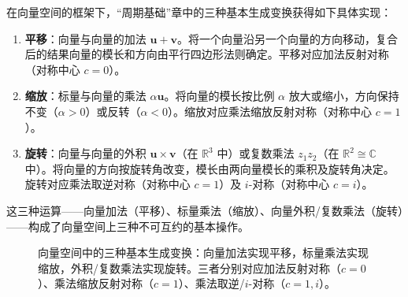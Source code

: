 \begin{definition}[向量运算与三种基本生成变换]\label{def:vector_three_transformations}
在向量空间的框架下，“周期基础”章中的三种基本生成变换获得如下具体实现：
\begin{enumerate}[label=(\roman*)]
    \item \textbf{平移}：向量与向量的加法 $\mathbf{u} + \mathbf{v}$。将一个向量沿另一个向量的方向移动，复合后的结果向量的模长和方向由平行四边形法则确定。平移对应加法反射对称（对称中心 $c=0$）。
    \item \textbf{缩放}：标量与向量的乘法 $\alpha \mathbf{u}$。将向量的模长按比例 $\alpha$ 放大或缩小，方向保持不变（$\alpha > 0$）或反转（$\alpha < 0$）。缩放对应乘法缩放反射对称（对称中心 $c = 1$）。
    \item \textbf{旋转}：向量与向量的外积 $\mathbf{u} \times \mathbf{v}$（在 $\mathbb{R}^3$ 中）或复数乘法 $z_1 z_2$（在 $\mathbb{R}^2 \cong \mathbb{C}$ 中）。将向量的方向按旋转角改变，模长由两向量模长的乘积及旋转角决定。旋转对应乘法取逆对称（对称中心 $c=1$）及 $i$-对称（对称中心 $c=i$）。
\end{enumerate}
这三种运算——向量加法（平移）、标量乘法（缩放）、向量外积/复数乘法（旋转）——构成了向量空间上三种不可互约的基本操作。
\end{definition}

\begin{figure}[htbp]
\centering
{}
\caption{向量空间中的三种基本生成变换：向量加法实现平移，标量乘法实现缩放，外积/复数乘法实现旋转。三者分别对应加法反射对称（$c=0$）、乘法缩放反射对称（$c=1$）、乘法取逆/$i$-对称（$c=1,i$）。}
\label{fig:three_transformations_vector}
\end{figure}
